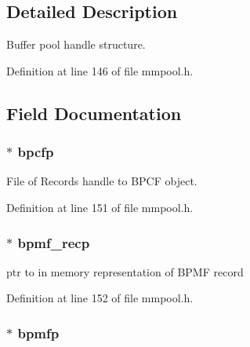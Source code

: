 \subsection{Detailed Description}
Buffer pool handle structure. 

Definition at line 146 of file mmpool.\-h.



\subsection{Field Documentation}
\hypertarget{struct__bpmf__pool__handle_ae7f6059d760dda3160d4510368eaa081}{
\subsubsection[{bpcfp}]{$\ast$ bpcfp}}\label{struct__bpmf__pool__handle_ae7f6059d760dda3160d4510368eaa081}


File of Records handle to B\-P\-C\-F object. 



Definition at line 151 of file mmpool.\-h.

\hypertarget{struct__bpmf__pool__handle_ad41847bd431cf72560236fd7a992c34d}{
\subsubsection[{bpmf\-\_\-recp}]{$\ast$ bpmf\-\_\-recp}}\label{struct__bpmf__pool__handle_ad41847bd431cf72560236fd7a992c34d}


ptr to in memory representation of B\-P\-M\-F record 



Definition at line 152 of file mmpool.\-h.

\hypertarget{struct__bpmf__pool__handle_a1f93789665c7c7fe6e6e64f71e3ad84b}{
\subsubsection[{bpmfp}]{$\ast$ bpmfp}}\label{struct__bpmf__pool__handle_a1f93789665c7c7fe6e6e64f71e3ad84b}


